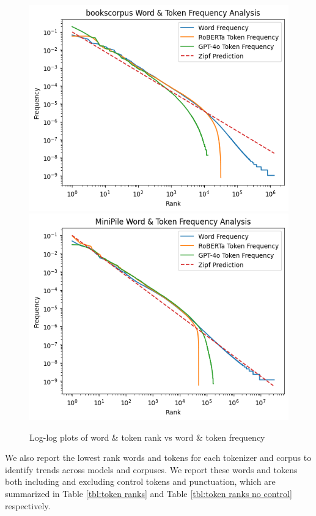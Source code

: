 \documentclass[11pt]{article}
\begin{document}
\begin{figure}[t]
  \includegraphics[width=\columnwidth]{../visualizations/bookscorpusfreq.png}
  \includegraphics[width=\columnwidth]{../visualizations/minipilecorpusfreq.png}
  \caption{Log-log plots of word \& token rank vs word \& token frequency}
  \label{fig:experiments}
\end{figure}

We also report the lowest rank words and tokens for each tokenizer and corpus to identify trends across models and corpuses. We report these words and tokens both including and excluding control tokens and punctuation, which are summarized in Table \ref{tbl:token ranks} and Table \ref{tbl:token ranks no control} respectively.
\end{document}
